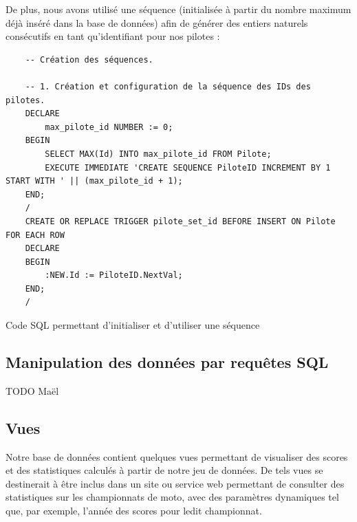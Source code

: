 \documentclass[12pt,a4paper]{article}
\newenvironment{code}{\captionsetup{type=listing}}{}
\begin{document}
De plus, nous avons utilisé une séquence (initialisée à partir du nombre maximum
déjà inséré dans la base de données) afin de générer des entiers naturels
consécutifs en tant qu'identifiant pour nos pilotes :

\begin{code}
    \begin{verbatim}
    -- Création des séquences.

    -- 1. Création et configuration de la séquence des IDs des pilotes.
    DECLARE
        max_pilote_id NUMBER := 0;
    BEGIN
        SELECT MAX(Id) INTO max_pilote_id FROM Pilote;
        EXECUTE IMMEDIATE 'CREATE SEQUENCE PiloteID INCREMENT BY 1 START WITH ' || (max_pilote_id + 1);
    END; 
    /
    CREATE OR REPLACE TRIGGER pilote_set_id BEFORE INSERT ON Pilote FOR EACH ROW
    DECLARE
    BEGIN
        :NEW.Id := PiloteID.NextVal;
    END;
    /
    \end{verbatim}
    \caption{Code SQL permettant d'initialiser et d'utiliser une séquence}
    \label{lst.seq}
\end{code}

\subsection{Manipulation des données par requêtes SQL}
\label{sub.req}

TODO Maël

\subsection{Vues}
\label{sub.views}

Notre base de données contient quelques vues permettant de visualiser des scores
et des statistiques calculés à partir de notre jeu de données. De tels vues se
destinerait à être inclus dans un site ou service web permettant de consulter
des statistiques sur les championnats de moto, avec des paramètres dynamiques
tel que, par exemple, l'année des scores pour ledit championnat.
\end{document}
